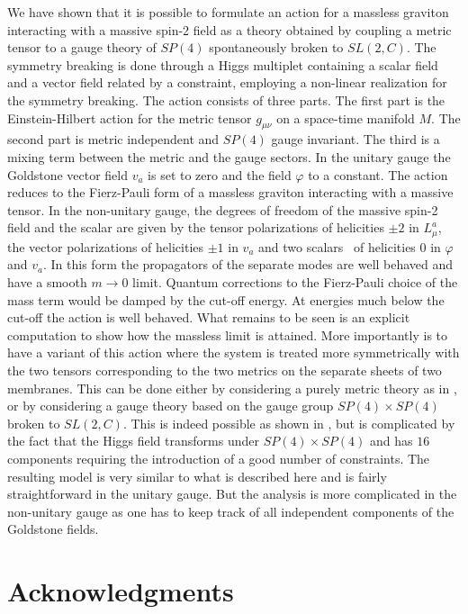 \documentclass[a4paper,12pt]{article}
\begin{document}
We have shown that it is possible to formulate an action for a massless
graviton interacting with a massive spin-2 field as a theory obtained by
coupling a metric tensor to a gauge theory of $SP(4)$ spontaneously broken to
$SL(2,C).$ The symmetry breaking is done through a Higgs multiplet containing
a scalar field and a vector field related by a constraint, employing a
non-linear realization for the symmetry breaking. The action consists of three
parts. The first part is the Einstein-Hilbert action for the metric tensor
$g_{\mu\nu}$ on a space-time manifold $M.$ The second part is metric
independent and $SP(4)$ gauge invariant. The third is a mixing term between
the metric and the gauge sectors. In the unitary gauge the Goldstone vector
field $v_{a}$ is set to zero and the field $\varphi$ to a constant. The action
reduces to the Fierz-Pauli form of a massless graviton interacting with a
massive tensor. In the non-unitary gauge, the degrees of freedom of the
massive spin-2 field and the scalar are given by the tensor polarizations of
helicities $\pm2$ in $L_{\mu}^{a}$, the vector polarizations of helicities
$\pm1$ in $v_{a}$ and two scalars \ of helicities $0$ in $\varphi$ and $v_{a}%
$. In this form the propagators of the separate modes are well behaved and
have a smooth $m\rightarrow0$ limit. Quantum corrections to the Fierz-Pauli
choice of the mass term would be damped by the cut-off energy. At energies
much below the cut-off the action is well behaved. What remains to be seen is
an explicit computation to show how the massless limit is attained. More
importantly is to have a variant of this action where the system is treated
more symmetrically with the two tensors corresponding to the two metrics on
the separate sheets of two membranes. This can be done either by considering a
purely metric theory as in \cite{ags}, or by considering a gauge theory based
on the gauge group $SP(4)\times SP(4)$ broken to $SL(2,C).$ This is indeed
possible as shown in \cite{css}, but is complicated by the fact that the Higgs
field transforms under $SP(4)\times SP(4)$ and has $16$ components requiring
the introduction of a good number of constraints. The resulting model is very
similar to what is described here and is fairly straightforward in the unitary
gauge. But the analysis is more complicated in the non-unitary gauge as one
has to keep track of all independent components of the Goldstone fields.

\section{Acknowledgments}
\end{document}
